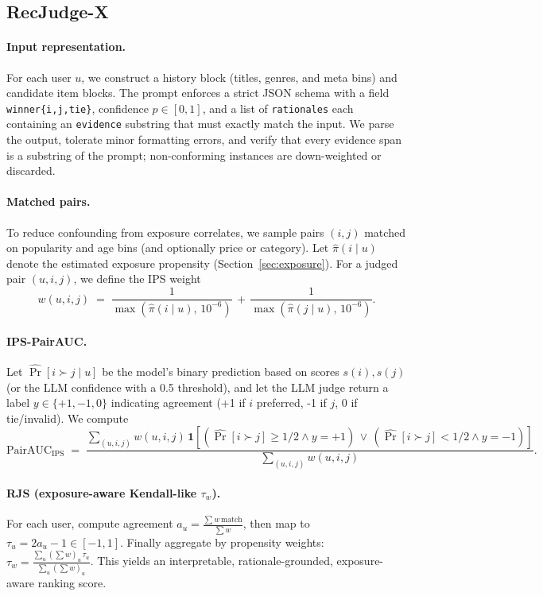 \documentclass[sigconf,anonymous,review]{acmart}
\begin{document}
\subsection{RecJudge-X}
\paragraph{Input representation.} For each user \(u\), we construct a history block (titles, genres, and meta bins) and candidate item blocks. The prompt enforces a strict JSON schema with a field \texttt{winner\;\in\;\{i,j,tie\}}, confidence \(p \in [0,1]\), and a list of \texttt{rationales} each containing an \texttt{evidence} substring that must exactly match the input. We parse the output, tolerate minor formatting errors, and verify that every evidence span is a substring of the prompt; non-conforming instances are down-weighted or discarded.

\paragraph{Matched pairs.} To reduce confounding from exposure correlates, we sample pairs \((i,j)\) matched on popularity and age bins (and optionally price or category). Let \(\hat{\pi}(i\mid u)\) denote the estimated exposure propensity (Section~\ref{sec:exposure}). For a judged pair \((u,i,j)\), we define the IPS weight
\begin{equation}
  w(u,i,j) \;=\; \frac{1}{\max(\hat{\pi}(i\mid u),\,10^{-6})} \, + \, \frac{1}{\max(\hat{\pi}(j\mid u),\,10^{-6})} .
\end{equation}

\paragraph{IPS-PairAUC.} Let \(\widehat{\Pr}[i\succ j\mid u]\) be the model’s binary prediction based on scores \(s(i), s(j)\) (or the LLM confidence with a 0.5 threshold), and let the LLM judge return a label \(y\in\{+1,-1,0\}\) indicating agreement (+1 if \(i\) preferred, -1 if \(j\), 0 if tie/invalid). We compute
\begin{equation}
  \mathrm{PairAUC}_{\text{IPS}} \;=\; \frac{\sum_{(u,i,j)} w(u,i,j)\, \mathbf{1}[(\widehat{\Pr}[i\succ j]\ge 1/2 \land y=+1)\,\lor\,(\widehat{\Pr}[i\succ j]<1/2 \land y=-1)]}{\sum_{(u,i,j)} w(u,i,j)}.
\end{equation}

\paragraph{RJS (exposure-aware Kendall-like \(\tau_w\)).} For each user, compute agreement \(a_u = \frac{\sum w\,\mathrm{match}}{\sum w}\), then map to \(\tau_u = 2a_u - 1\in[-1,1]\). Finally aggregate by propensity weights: \(\tau_w = \frac{\sum_u (\sum w)_u\,\tau_u}{\sum_u (\sum w)_u}\). This yields an interpretable, rationale-grounded, exposure-aware ranking score.
\end{document}
